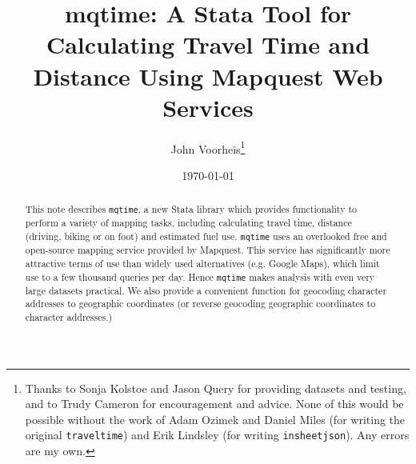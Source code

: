 \documentclass[12pt]{article}
\title{mqtime: A Stata Tool for Calculating Travel Time and Distance Using Mapquest Web Services}
\author{John Voorheis\thanks{Thanks to Sonja Kolstoe and Jason Query for providing datasets and testing, and to Trudy Cameron for encouragement and advice. None of this would be possible without the work of Adam Ozimek and Daniel Miles (for writing the original \texttt{traveltime}) and Erik Lindsley (for writing \texttt{insheetjson}). Any errors are my own.}}
\affil{University of Oregon}
\date{\today}
\begin{document}
\maketitle

\begin{abstract}
This note describes  \verb|mqtime|, a new Stata library which provides functionality to perform a variety of mapping tasks, including calculating travel time, distance (driving, biking or on foot) and estimated fuel use.  \verb|mqtime| uses an overlooked free and open-source mapping service provided by Mapquest. This service has significantly more attractive terms of use than widely used alternatives (e.g. Google Maps), which limit use to a few thousand queries per day. Hence \verb|mqtime| makes analysis with even very large datasets practical. We also provide a convenient function for geocoding character addresses to geographic coordinates (or reverse geocoding geographic coordinates to character addresses.) 
\end{abstract}

\newpage
\end{document}

